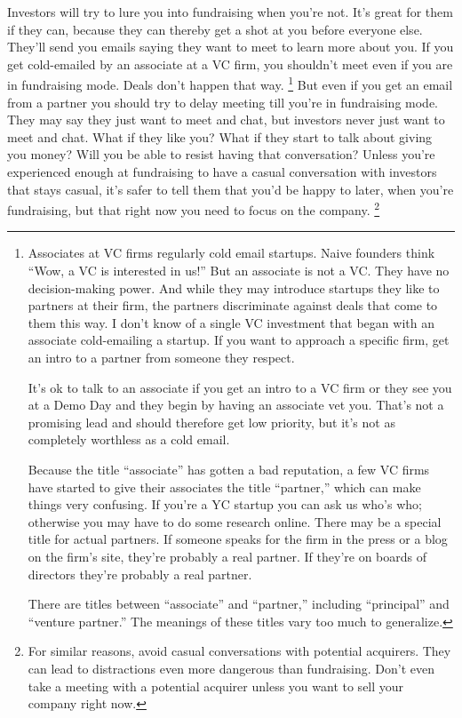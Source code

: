 \documentclass[12pt]{book}
\begin{document}
Investors will try to lure you into fundraising when you're not. It's
great for them if they can, because they can thereby get a shot at you
before everyone else. They'll send you emails saying they want to meet
to learn more about you. If you get cold-emailed by an associate at a VC
firm, you shouldn't meet even if you are in fundraising mode. Deals
don't happen that way. \footnote{Associates at VC firms regularly cold email startups. Naive
founders think ``Wow, a VC is interested in us!'' But an associate is
not a VC. They have no decision-making power. And while they may
introduce startups they like to partners at their firm, the partners
discriminate against deals that come to them this way. I don't know of a
single VC investment that began with an associate cold-emailing a
startup. If you want to approach a specific firm, get an intro to a
partner from someone they respect.

It's ok to talk to an associate if you get an intro to a VC firm or they
see you at a Demo Day and they begin by having an associate vet you.
That's not a promising lead and should therefore get low priority, but
it's not as completely worthless as a cold email.

Because the title ``associate'' has gotten a bad reputation, a few VC
firms have started to give their associates the title ``partner,'' which
can make things very confusing. If you're a YC startup you can ask us
who's who; otherwise you may have to do some research online. There may
be a special title for actual partners. If someone speaks for the firm
in the press or a blog on the firm's site, they're probably a real
partner. If they're on boards of directors they're probably a real
partner.

There are titles between ``associate'' and ``partner,'' including
``principal'' and ``venture partner.'' The meanings of these titles vary
too much to generalize.} But even if you get an
email from a partner you should try to delay meeting till you're in
fundraising mode. They may say they just want to meet and chat, but
investors never just want to meet and chat. What if they like you? What
if they start to talk about giving you money? Will you be able to resist
having that conversation? Unless you're experienced enough at
fundraising to have a casual conversation with investors that stays
casual, it's safer to tell them that you'd be happy to later, when
you're fundraising, but that right now you need to focus on the company.
\footnote{For similar reasons, avoid casual conversations with potential
acquirers. They can lead to distractions even more dangerous than
fundraising. Don't even take a meeting with a potential acquirer unless
you want to sell your company right now.}
\end{document}
